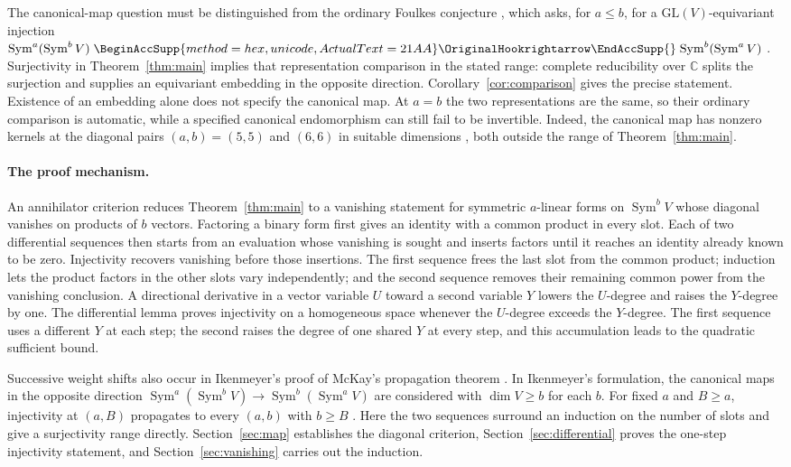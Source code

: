 \documentclass[11pt]{article}
\renewcommand{\hookrightarrow}{\mathrel{%
  \BeginAccSupp{method=hex,unicode,ActualText=21AA}%
  \OriginalHookrightarrow\EndAccSupp{}}}
\theoremstyle{remark}
\DeclareMathOperator{\Sym}{Sym}
\newcommand{\C}{\mathbb C}
\begin{document}
The canonical-map question must be distinguished from the ordinary
Foulkes conjecture \cite{Foulkes1950}, which asks, for $a\le b$, for a
$\mathrm{GL}(V)$-equivariant injection
$\Sym^a(\Sym^b V)\hookrightarrow\Sym^b(\Sym^a V)$
\cite[Conjecture~2.10]{RSW}.
Surjectivity in Theorem~\ref{thm:main} implies that representation
comparison in the stated range: complete reducibility over $\C$ splits
the surjection and supplies an equivariant embedding in the opposite
direction. Corollary~\ref{cor:comparison} gives the precise statement.
Existence of an embedding alone does not specify the canonical map.
At $a=b$ the two representations are the same, so their ordinary comparison
is automatic, while a specified canonical endomorphism can still fail to be
invertible. Indeed, the canonical map has nonzero kernels at the diagonal pairs
$(a,b)=(5,5)$ and $(6,6)$ in suitable dimensions
\cite[arXiv version, Theorem~6(b),(c) and Remark~7]{CIM}, both outside the range of
Theorem~\ref{thm:main}.

\paragraph{The proof mechanism.}
An annihilator criterion reduces Theorem~\ref{thm:main} to a vanishing
statement for symmetric $a$-linear forms on $\Sym^b V$ whose diagonal
vanishes on products of $b$ vectors. Factoring a binary form first gives an
identity with a common product in every slot. Each of two differential
sequences then starts from an evaluation whose vanishing is sought and
inserts factors until it reaches an identity already known to be zero.
Injectivity recovers vanishing before those insertions. The first sequence
frees the last slot from the common product; induction lets the product
factors in the other slots vary independently; and the second sequence
removes their remaining common power from the vanishing conclusion.
A directional derivative in a vector variable $U$ toward a second variable
$Y$ lowers the $U$-degree and raises the $Y$-degree by one. The differential
lemma proves injectivity on a homogeneous space whenever the $U$-degree
exceeds the $Y$-degree. The first sequence uses a different $Y$ at each step;
the second raises the degree of one shared $Y$ at every step, and this
accumulation leads to the quadratic sufficient bound.

Successive weight shifts also occur in Ikenmeyer's proof
\cite[Section~5]{Ikenmeyer} of McKay's propagation theorem \cite{McKay}.
In Ikenmeyer's formulation, the canonical maps in the opposite direction
$\Sym^a(\Sym^b V)\longrightarrow\Sym^b(\Sym^a V)$ are considered with
$\dim V\ge b$ for each $b$. For fixed $a$ and $B\ge a$, injectivity at
$(a,B)$ propagates to every $(a,b)$ with $b\ge B$
\cite[Theorem~1.3 and Section~3]{Ikenmeyer}.
Here the two sequences surround an induction on the number of slots and
give a surjectivity range directly.
Section~\ref{sec:map} establishes the diagonal criterion,
Section~\ref{sec:differential} proves the one-step injectivity statement,
and Section~\ref{sec:vanishing} carries out the induction.
\end{document}
